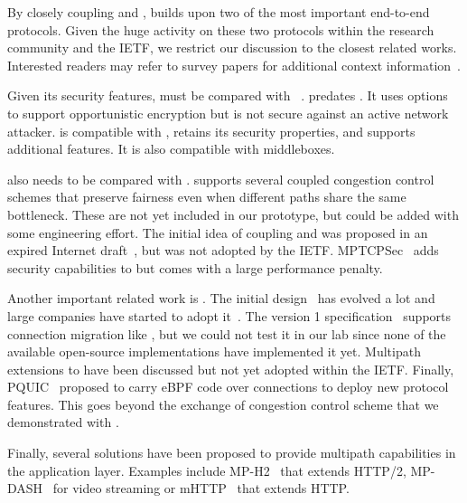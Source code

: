 
By closely coupling \tcp and \tls, \tcpls builds upon two of the most important
end-to-end protocols. Given the huge activity on these two protocols within the
research community and the IETF, we restrict our discussion to the closest
related works. Interested readers may refer to survey papers for additional context information~\cite{polese2019survey,li2016multipath,papastergiou2016ossifying}.

Given its security features, \tcpls must be compared with \tcpcrypt~\cite{bittau2010case,rfc8548}. \tcpcrypt predates . It uses \tcp options to support opportunistic encryption but is not secure against an active network attacker. \tcpls is compatible with \tls, retains its security properties, and supports additional features. It is also compatible with \tcp middleboxes.

\tcpls also needs to be compared with \mptcp \cite{raiciu2012hard,rfc6824}.
\mptcp supports several coupled congestion control schemes
\cite{peng2014multipath,wischik2011design,khalili2013mptcp} that preserve
fairness even when different paths share the same bottleneck. These are not yet
included in our \tcpls prototype, but could be added with some engineering
effort. The initial idea of coupling \mptcp and \tls was proposed in an expired
Internet draft~\cite{draft-paasch-mptcp-ssl-00}, but was not adopted by the
IETF. MPTCPSec~\cite{jadin2017securing} adds security capabilities to \mptcp but
comes with a large performance penalty.

Another important related work is \quic. The initial design~\cite{roskind2013quic} has evolved a lot and large companies have started to adopt it~\cite{langley2017quic,Joras_mvfst,marx2020same}. The \quic
version 1 specification~\cite{draft-ietf-quic-transport} supports connection
migration like \tcpls, but we could not test it in our lab since none of the
available open-source implementations have implemented it yet. Multipath
extensions
\cite{viernickel2018multipath,de2017multipath,draft-deconinck-quic-multipath-06,draft-liu-multipath-quic-02}
to \quic have been discussed but not yet adopted within the IETF. Finally, PQUIC~\cite{de2019pluginizing} proposed to carry eBPF code over \quic connections to deploy new protocol features. This goes beyond the exchange of congestion control scheme that we demonstrated with \tcpls.

Finally, several solutions have been proposed to provide multipath capabilities
in the application layer. Examples include MP-H2~\cite{nikravesh2019mp} that
extends HTTP/2, MP-DASH~\cite{han2016mp} for video streaming or mHTTP~\cite{kim2014multi} that extends HTTP.

